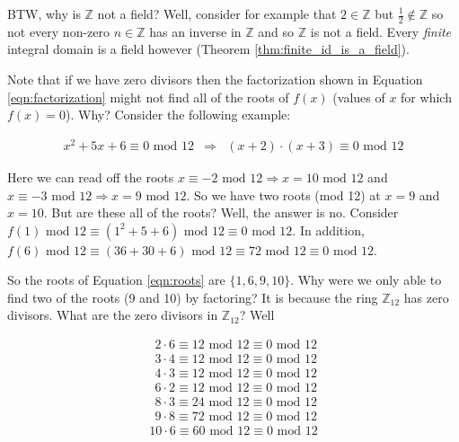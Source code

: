 \documentclass[11pt, oneside]{article}   	%
\theoremstyle{definition}
\begin{document}
\bigskip
\noindent
BTW,  why is $\mathbb{Z}$ not a field? Well, consider for example that $2 \in \mathbb{Z}$ but $\frac{1}{2} \notin \mathbb{Z}$ so not every 
non-zero $n \in \mathbb{Z}$ has an inverse in $\mathbb{Z}$ and so $\mathbb{Z}$  is not a field. Every \emph{finite} 
integral domain is a field however (Theorem \ref{thm:finite_id_is_a_field}).

\bigskip
\noindent
Note that if we have zero divisors then the factorization  shown in Equation \ref{eqn:factorization} might not find all of
the roots of $f(x)$ (values of $x$ for which $f(x) = 0$). Why? Consider the following example:

\begin{equation}
\begin{array}{rcll} 
x^2 + 5x +6 \equiv 0 \text{ mod } 12
&\Rightarrow& (x + 2) \cdot (x + 3) \equiv 0 \text{ mod } 12 
\end{array}
\label{eqn:roots}
\end{equation}

\bigskip
\noindent
Here we can read off the roots $x \equiv -2 \text{ mod } 12 \Rightarrow x  = 10 \text{ mod } 12$ and 
$x \equiv -3 \text{ mod } 12 \Rightarrow x  = 9 \text{ mod } 12$. So we have two roots (mod 12) 
at $x = 9$ and $x = 10$. But are these all of the roots? Well, the answer is no. Consider
$f(1) \text{ mod } 12 \equiv (1^2 + 5 + 6) \text{ mod } 12 \equiv 0 \text{ mod } 12$. In addition,
$f(6) \text{ mod } 12 \equiv (36 + 30 +6) \text{ mod } 12 \equiv 72 \text{ mod } 12 \equiv 0 \text{ mod } 12$.

\bigskip
\noindent
So the roots of Equation \ref{eqn:roots} are $\{1,6,9,10\}$. Why were we only able to find
two of the roots (9 and 10) by factoring? It is because the ring $\mathbb{Z}_{12}$ has 
zero divisors. What are the zero divisors in $\mathbb{Z}_{12}$? Well


\begin{equation}
\begin{array}{lrcll} 
\,\; 2   \cdot 6     \equiv     12 \text{ mod } 12 \equiv 0 \text{ mod } 12 \\
\,\; 3   \cdot 4     \equiv     12 \text{ mod } 12 \equiv 0 \text{ mod } 12 \\
\,\; 4   \cdot 3     \equiv    12 \text{ mod } 12 \equiv 0 \text{ mod } 12 \\
\,\; 6   \cdot 2     \equiv    12 \text{ mod } 12 \equiv 0  \text{ mod } 12 \\
\,\; 8   \cdot 3     \equiv     24 \text{ mod } 12 \equiv 0  \text{ mod } 12 \\
\,\; 9   \cdot 8     \equiv     72 \text{ mod } 12 \equiv 0  \text{ mod } 12 \\
10      \cdot 6     \equiv     60 \text{ mod } 12 \equiv 0  \text{ mod } 12 \\
\end{array}
\end{equation}
\end{document}
